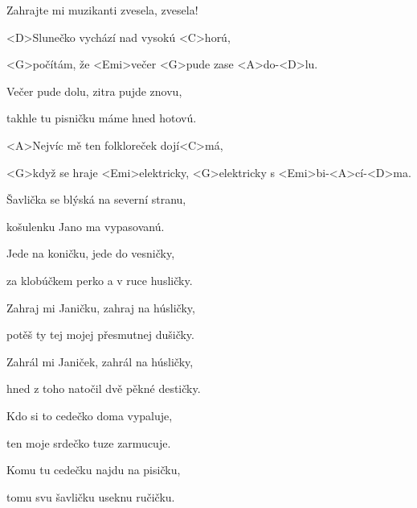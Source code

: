 

Zahrajte mi muzikanti zvesela, zvesela!

\zs
<D>Slunečko vychází nad vysokú <C>horú,

<G>počítám, že <Emi>večer <G>pude zase <A>do-<D>lu.

Večer pude dolu, zitra pujde znovu,

takhle tu pisničku máme hned hotovú.
\ks

\zr
<A>Nejvíc mě ten folkloreček {do}{jí}<C>má,

<G>když se hraje <Emi>elektricky, <G>elektricky s <Emi>bi-<A>cí-<D>ma.
\kr

\zs
Šavlička se blýská na severní stranu,

košulenku Jano ma vypasovanú.

Jede na koničku, jede do vesničky,

za klobúčkem perko a v ruce husličky.
\ks

\zr \kr

\zs
Zahraj mi Janičku, zahraj na húsličky,

potěš ty tej mojej přesmutnej dušičky.

Zahrál mi Janiček, zahrál na húsličky,

hned z toho natočil dvě pěkné destičky.

\ks

\zr \kr

\zs
Kdo si to cedečko doma vypaluje,

ten moje srdečko tuze zarmucuje.

Komu tu cedečku najdu na pisičku,

tomu svu šavličku useknu ručičku.
\ks

\zr \kr

\kp
